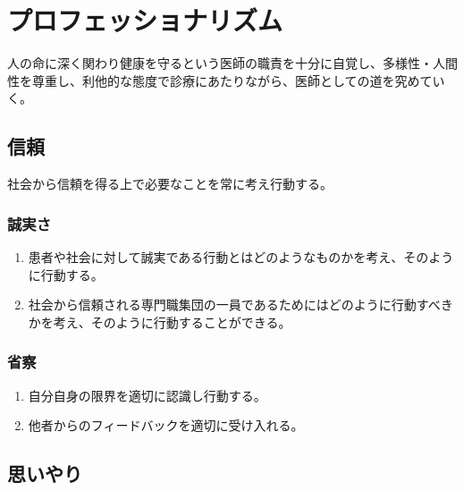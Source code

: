 \newpage

\hypertarget{ux30d7ux30edux30d5ux30a7ux30c3ux30b7ux30e7ux30caux30eaux30baux30e0}{%
\section{プロフェッショナリズム}\label{ux30d7ux30edux30d5ux30a7ux30c3ux30b7ux30e7ux30caux30eaux30baux30e0}}

人の命に深く関わり健康を守るという医師の職責を十分に自覚し、多様性・人間性を尊重し、利他的な態度で診療にあたりながら、医師としての道を究めていく。

\hypertarget{ux4fe1ux983c}{%
\subsection{信頼}\label{ux4fe1ux983c}}

社会から信頼を得る上で必要なことを常に考え行動する。

\hypertarget{ux8aa0ux5b9fux3055}{%
\subsubsection{誠実さ}\label{ux8aa0ux5b9fux3055}}

\begin{enumerate}
\def\labelenumi{\arabic{enumi}.}
\tightlist
\item
  患者や社会に対して誠実である行動とはどのようなものかを考え、そのように行動する。
\item
  社会から信頼される専門職集団の一員であるためにはどのように行動すべきかを考え、そのように行動することができる。
\end{enumerate}

\hypertarget{ux7701ux5bdf}{%
\subsubsection{省察}\label{ux7701ux5bdf}}

\begin{enumerate}
\def\labelenumi{\arabic{enumi}.}
\tightlist
\item
  自分自身の限界を適切に認識し行動する。
\item
  他者からのフィードバックを適切に受け入れる。
\end{enumerate}

\hypertarget{ux601dux3044ux3084ux308a}{%
\subsection{思いやり}\label{ux601dux3044ux3084ux308a}}

